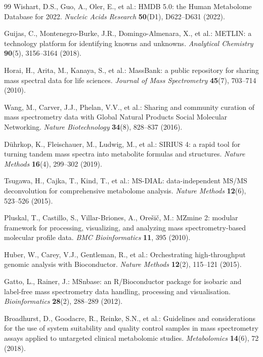 \documentclass[11pt,twoside,openright]{book}
\begin{document}
\begin{thebibliography}{99}
Wishart, D.S., Guo, A., Oler, E., et al.: HMDB 5.0: the Human Metabolome Database for 2022.
\textit{Nucleic Acids Research} \textbf{50}(D1), D622--D631 (2022).

Guijas, C., Montenegro-Burke, J.R., Domingo-Almenara, X., et al.: METLIN: a technology platform for identifying knowns and unknowns.
\textit{Analytical Chemistry} \textbf{90}(5), 3156--3164 (2018).

Horai, H., Arita, M., Kanaya, S., et al.: MassBank: a public repository for sharing mass spectral data for life sciences.
\textit{Journal of Mass Spectrometry} \textbf{45}(7), 703--714 (2010).

Wang, M., Carver, J.J., Phelan, V.V., et al.: Sharing and community curation of mass spectrometry data with Global Natural Products Social Molecular Networking.
\textit{Nature Biotechnology} \textbf{34}(8), 828--837 (2016).

D{\"u}hrkop, K., Fleischauer, M., Ludwig, M., et al.: SIRIUS 4: a rapid tool for turning tandem mass spectra into metabolite formulas and structures.
\textit{Nature Methods} \textbf{16}(4), 299--302 (2019).

Tsugawa, H., Cajka, T., Kind, T., et al.: MS-DIAL: data-independent MS/MS deconvolution for comprehensive metabolome analysis.
\textit{Nature Methods} \textbf{12}(6), 523--526 (2015).

Pluskal, T., Castillo, S., Villar-Briones, A., Ore{\v{s}}i{\v{c}}, M.: MZmine 2: modular framework for processing, visualizing, and analyzing mass spectrometry-based molecular profile data.
\textit{BMC Bioinformatics} \textbf{11}, 395 (2010).

Huber, W., Carey, V.J., Gentleman, R., et al.: Orchestrating high-throughput genomic analysis with Bioconductor.
\textit{Nature Methods} \textbf{12}(2), 115--121 (2015).

Gatto, L., Rainer, J.: MSnbase: an R/Bioconductor package for isobaric and label-free mass spectrometry data handling, processing and visualisation.
\textit{Bioinformatics} \textbf{28}(2), 288--289 (2012).

Broadhurst, D., Goodacre, R., Reinke, S.N., et al.: Guidelines and considerations for the use of system suitability and quality control samples in mass spectrometry assays applied to untargeted clinical metabolomic studies.
\textit{Metabolomics} \textbf{14}(6), 72 (2018).

\end{thebibliography}
\end{document}
